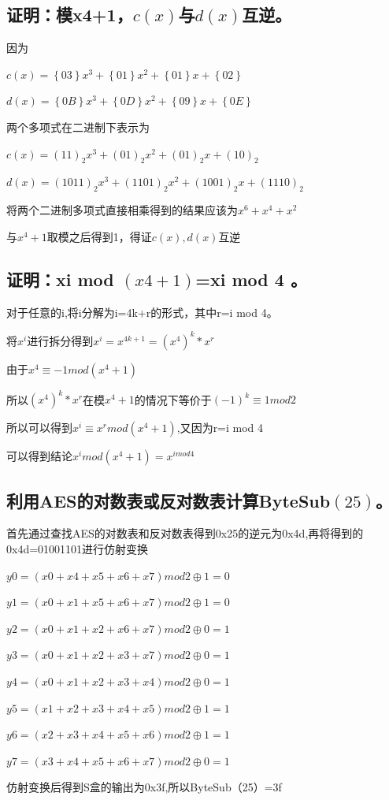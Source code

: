 \documentclass[a4paper,11pt,UTF8]{ctexart}
\begin{document}
    \subsection{证明：模x4+1，$c(x)$与$d(x)$互逆。}
        因为\par
        $c(x)=\left \{ 03 \right \}x^{3}+\left \{ 01 \right \} x^{2}+\left \{  01\right \} x+\left \{ 02 \right \}   $\par
        $d(x)=\left \{ 0B \right \}x^{3}+\left \{ 0D \right \} x^{2}+\left \{  09\right \} x+\left \{ 0E \right \}   $\par
        两个多项式在二进制下表示为\par
        $c(x)=\left (  11\right ) _{2} x^{3}+\left ( 01 \right )_{2}  x^{2}+\left ( 01 \right )_{2}  x+\left ( 10 \right )_{2}  $\par
        $d(x)=\left (  1011\right ) _{2} x^{3}+\left ( 1101 \right )_{2}  x^{2}+\left ( 1001 \right )_{2}  x+\left ( 1110 \right )_{2}   $\par
        将两个二进制多项式直接相乘得到的结果应该为$x^{6}+x^{4}+x^{2}$\par
        与$x^{4}+1$取模之后得到1，得证$c(x),d(x)$互逆
\newpage
    \subsection{证明：xi mod $(x4+1)$=xi mod 4 。}
        对于任意的i,将i分解为i=4k+r的形式，其中r=i mod 4。\par
        将$x^{i}$进行拆分得到$x^{i}=x^{4k+1}=(x^{4})^{k}*x^{r}$\par
        由于$x^{4}\equiv -1 mod (x^{4}+1)$\par
        所以$(x^{4})^{k}*x^{r}$在模$x^{4}+1$的情况下等价于$(-1)^{k}\equiv 1 mod 2$\par
        所以可以得到$x^{i}\equiv x^{r} mod (x^{4}+1)$,又因为r=i mod 4\par
        可以得到结论$x^{i} mod (x^{4}+1)=x^{i mod 4} $

    \subsection{利用AES的对数表或反对数表计算ByteSub$(25)$。}
        首先通过查找AES的对数表和反对数表得到0x25的逆元为0x4d,再将得到的0x4d=01001101进行仿射变换\par
        $y0=(x0+x4+x5+x6+x7)mod 2 \oplus 1 =0$\par
        $y1=(x0+x1+x5+x6+x7)mod 2 \oplus 1=0$\par
        $y2=(x0+x1+x2+x6+x7)mod 2 \oplus 0=1$\par
        $y3=(x0+x1+x2+x3+x7)mod 2 \oplus 0=1$\par
        $y4=(x0+x1+x2+x3+x4)mod 2 \oplus 0=1$\par
        $y5=(x1+x2+x3+x4+x5)mod 2 \oplus 1=1$\par
        $y6=(x2+x3+x4+x5+x6)mod 2 \oplus 1=1$\par
        $y7=(x3+x4+x5+x6+x7)mod 2 \oplus 0=1$\par
        仿射变换后得到S盒的输出为0x3f,所以ByteSub（25）=3f
\end{document}
